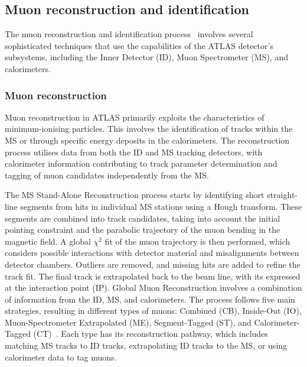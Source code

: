    \subsection{Muon reconstruction and identification}
        The muon reconstruction and identification process~\cite{MUON-2018-03} involves several sophisticated techniques that use the 
        capabilities of the ATLAS detector's subsystems, including the Inner Detector (ID), Muon Spectrometer (MS), 
        and calorimeters.
        
        \subsubsection{Muon reconstruction}
            Muon reconstruction in ATLAS primarily exploits the characteristics of minimum-ionising particles. This involves the identification of 
            tracks within the MS or through specific energy deposits in the calorimeters. The reconstruction process utilises data from both the 
            ID and MS tracking detectors, with calorimeter information contributing to track parameter determination and tagging of muon candidates 
            independently from the MS.
        
            The MS Stand-Alone Reconstruction process starts by identifying short straight-line segments from hits in individual MS stations using 
            a Hough transform. These segments are combined into track candidates, taking into account the initial pointing constraint and the 
            parabolic trajectory of the muon bending in the magnetic field. A global $\chi^2$ fit of the muon trajectory is then performed, 
            which considers possible interactions with detector material and misalignments between detector chambers. Outliers are removed, 
            and missing hits are added to refine the track fit. The final track is extrapolated back to the beam line, with its \pT expressed 
            at the interaction point (IP). Global Muon Reconstruction involves a combination of information from the ID, MS, and calorimeters. 
            The process follows five main strategies, resulting in different types of muons: Combined (CB), Inside-Out (IO), Muon-Spectrometer 
            Extrapolated (ME), Segment-Tagged (ST), and Calorimeter-Tagged (CT)~\cite{MUON-2018-03}. Each type has its reconstruction pathway, which includes 
            matching MS tracks to ID tracks, extrapolating ID tracks to the MS, or using calorimeter data to tag muons.
        
